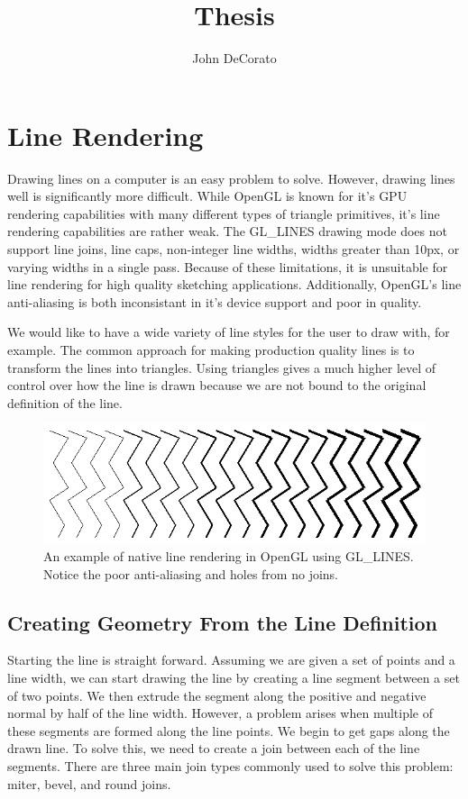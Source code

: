 \documentclass[12pt]{report}
\title{Thesis}
\author{John DeCorato}
\date{ }
\begin{document}
\chapter{Line Rendering}

Drawing lines on a computer is an easy problem to solve. 
However, drawing lines well is significantly more difficult.
While OpenGL is known for it's GPU rendering capabilities with many different types of triangle primitives, it's line rendering capabilities are rather weak.
The GL\_LINES drawing mode does not support line joins, line caps, non-integer line widths, widths greater than 10px, or varying widths in a single pass.
Because of these limitations, it is unsuitable for line rendering for high quality sketching applications.
Additionally, OpenGL's line anti-aliasing is both inconsistant in it's device support and poor in quality.

We would like to have a wide variety of line styles for the user to draw with, for example.
The common approach for making production quality lines is to transform the lines into triangles. 
Using triangles gives a much higher level of control over how the line is drawn because we are not bound to the original definition of the line.

\begin{figure}
\includegraphics[width=\linewidth]{opengllines}
\caption{An example of native line rendering in OpenGL using GL\_LINES. Notice the poor anti-aliasing and holes from no joins.}
\end{figure}

\section{Creating Geometry From the Line Definition}


Starting the line is straight forward. 
Assuming we are given a set of points and a line width, we can start drawing the line by creating a line segment between a set of two points. We then extrude the segment along the positive and negative normal by half of the line width.
However, a problem arises when multiple of these segments are formed along the line points.
We begin to get gaps along the drawn line. 
To solve this, we need to create a join between each of the line segments.
There are three main join types commonly used to solve this problem: miter, bevel, and round joins.
\end{document}

